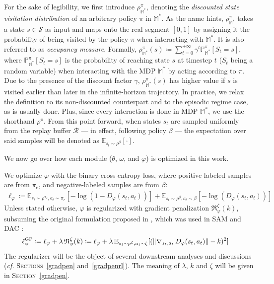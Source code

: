 For the sake of legibility, we first introduce $\rho^\pi_{\mathbb{M}^*}$, denoting
the \textit{discounted state visitation distribution}
of an arbitrary policy $\pi$ in $\mathbb{M}^*$.
As the name hints, $\rho^\pi_{\mathbb{M}^*}$ takes a state $s \in \mathcal{S}$
as input and maps onto
the real segment $[0,1]$ by assigning it the probability of being visited
by the policy $\pi$ when interacting with $\mathbb{M}^*$.
It is also referred to as \emph{occupancy measure}.
Formally,
$\rho^\pi_{\mathbb{M}^*} (s)
\coloneqq
\sum_{t=0}^{+\infty} \gamma^t \mathbb{P}^\pi_{\mathbb{M}^*} [S_t=s]$,
where $\mathbb{P}^\pi_{\mathbb{M}^*} [S_t=s]$ is the probability of reaching state $s$
at timestep $t$ ($S_t$ being a random variable) when interacting with the MDP $\mathbb{M}^*$
by acting according to $\pi$.
Due to the presence of the discount factor $\gamma$, $\rho^\pi_{\mathbb{M}^*} (s)$ has higher value
if $s$ is visited earlier than later in the infinite-horizon trajectory.
In practice, we relax the definition to its non-discounted counterpart and to
the episodic regime case, as is usually done.
Plus, since every interaction is done in MDP $\mathbb{M}^*$, we use the shorthand $\rho^\pi$.
From this point forward, when states $s_t$ are sampled uniformly
from the replay buffer $\mathcal{R}$ --- in effect, following policy $\beta$ ---
the expectation over said samples will be denoted as $\mathbb{E}_{s_t \sim \rho^\beta} [\cdot]$.

We now go over how each module ($\theta$, $\omega$, and $\varphi$) is optimized in this work.

We optimize $\varphi$ with the binary cross-entropy loss, where positive-labeled samples are
from $\pi_e$, and negative-labeled samples are from $\beta$:
\begin{align}
\ell_\varphi \coloneqq
\mathbb{E}_{s_t \sim \rho^{\pi_e}, a_t \sim \pi_e}[-\log(1 - D_\varphi(s_t, a_t))]
+ \mathbb{E}_{s_t \sim \rho^\beta, a_t \sim \beta}[-\log(D_\varphi(s_t, a_t))]
\label{varphiloss}
\end{align}
Unless stated otherwise, $\varphi$ is regularized with
gradient penalization $\mathfrak{R}_\varphi^\zeta (k)$,
subsuming the original formulation proposed in \cite{Gulrajani2017-mr},
which was used in SAM \cite{Blonde2019-vc} and DAC \cite{Kostrikov2019-jo}:
\begin{align}
\ell_\varphi^\textsc{GP}
&\coloneqq \ell_\varphi + \lambda \, \mathfrak{R}_\varphi^\zeta (k)
\coloneqq \ell_\varphi + \lambda \,
\mathbb{E}_{s_t \sim \rho^{\zeta}, a_t \sim \zeta}
[(\lVert  \nabla _{s_t,a_t} \, D_\varphi(s_t,a_t) \rVert - k )^2]
\label{varphilossgp}
\end{align}
The regularizer will be the object of several downstream analyses and discussions
(\textit{cf.} \textsc{Sections}~\ref{gradpen} and~\ref{gradpenrl}).
The meaning of $\lambda$, $k$ and $\zeta$ will be given in \textsc{Section}~\ref{gradpen}.

